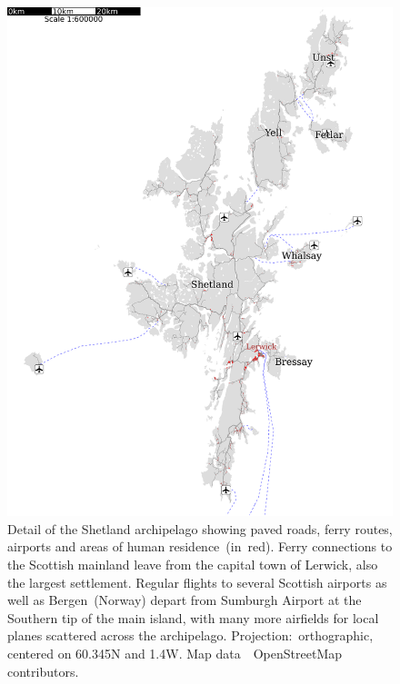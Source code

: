 \begin{figure}
\includegraphics{figure/shetland}
\caption[Detail of the Shetland archipelago]{Detail of the Shetland archipelago showing paved roads, ferry routes, airports and areas of human residence~(in~red). Ferry connections to the Scottish mainland leave from the capital town of Lerwick, also the largest settlement. Regular flights to several Scottish airports as well as Bergen~(Norway) depart from Sumburgh Airport at the Southern tip of the main island, with many more airfields for local planes scattered across the archipelago. Projection:~orthographic, centered on 60.345\textdegree N and 1.4\textdegree W. Map data~\textcopyright~OpenStreetMap contributors.}
\label{fig:shetland}
\end{figure}

